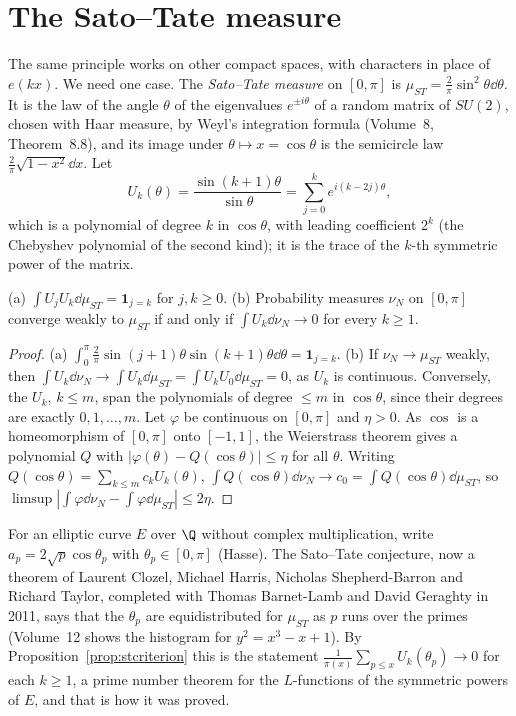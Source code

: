 \section{The Sato--Tate measure}

The same principle works on other compact spaces, with characters in place of $e(kx)$. We need one case. The \emph{Sato--Tate measure} on $[0,\pi]$ is $\mu_{ST}=\frac2\pi\sin^2\theta\dd\theta$. It is the law of the angle $\theta$ of the eigenvalues $e^{\pm i\theta}$ of a random matrix of $SU(2)$, chosen with Haar measure, by Weyl's integration formula (Volume~8, Theorem~8.8), and its image under $\theta\mapsto x=\cos\theta$ is the semicircle law $\frac2\pi\sqrt{1-x^2}\dd x$. Let
\[
U_k(\theta)=\frac{\sin(k+1)\theta}{\sin\theta}=\sum_{j=0}^ke^{i(k-2j)\theta},
\]
which is a polynomial of degree $k$ in $\cos\theta$, with leading coefficient $2^k$ (the Chebyshev polynomial of the second kind); it is the trace of the $k$-th symmetric power of the matrix.

\begin{proposition}\label{prop:stcriterion}
(a) $\int U_jU_k\dd\mu_{ST}=\mathbf 1_{j=k}$ for $j,k\ge0$. (b) Probability measures $\nu_N$ on $[0,\pi]$ converge weakly to $\mu_{ST}$ if and only if $\int U_k\dd\nu_N\to0$ for every $k\ge1$.
\end{proposition}
\begin{proof}
(a) $\int_0^\pi\frac2\pi\sin(j+1)\theta\sin(k+1)\theta\dd\theta=\mathbf 1_{j=k}$. (b) If $\nu_N\to\mu_{ST}$ weakly, then $\int U_k\dd\nu_N\to\int U_k\dd\mu_{ST}=\int U_kU_0\dd\mu_{ST}=0$, as $U_k$ is continuous. Conversely, the $U_k$, $k\le m$, span the polynomials of degree $\le m$ in $\cos\theta$, since their degrees are exactly $0,1,\dots,m$. Let $\varphi$ be continuous on $[0,\pi]$ and $\eta>0$. As $\cos$ is a homeomorphism of $[0,\pi]$ onto $[-1,1]$, the Weierstrass theorem gives a polynomial $Q$ with $|\varphi(\theta)-Q(\cos\theta)|\le\eta$ for all $\theta$. Writing $Q(\cos\theta)=\sum_{k\le m}c_kU_k(\theta)$, $\int Q(\cos\theta)\dd\nu_N\to c_0=\int Q(\cos\theta)\dd\mu_{ST}$, so $\limsup|\int\varphi\dd\nu_N-\int\varphi\dd\mu_{ST}|\le2\eta$.
\end{proof}

For an elliptic curve $E$ over $\Q$ without complex multiplication, write $a_p=2\sqrt p\cos\theta_p$ with $\theta_p\in[0,\pi]$ (Hasse). The Sato--Tate conjecture, now a theorem of Laurent Clozel, Michael Harris, Nicholas Shepherd-Barron and Richard Taylor, completed with Thomas Barnet-Lamb and David Geraghty in 2011, says that the $\theta_p$ are equidistributed for $\mu_{ST}$ as $p$ runs over the primes (Volume~12 shows the histogram for $y^2=x^3-x+1$). By Proposition~\ref{prop:stcriterion} this is the statement $\frac1{\pi(x)}\sum_{p\le x}U_k(\theta_p)\to0$ for each $k\ge1$, a prime number theorem for the $L$-functions of the symmetric powers of $E$, and that is how it was proved.

